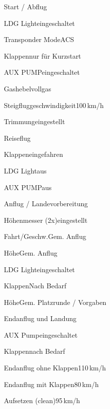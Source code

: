 \begin{checklist}{Start / Abflug}
	  \item{LDG Light}{eingeschaltet}
	  \item{Transponder Mode}{ACS}
	  \item{Klappen}{nur für Kurzstart}
	  \item{AUX PUMP}{eingeschaltet}
	  \item{Gashebel}{vollgas}
	\item{Steigfluggeschwindigkeit}{100\,km/h}
	\item{Trimmung}{eingestellt}
\end{checklist}
	
\begin{checklist}{Reiseflug}
	\item{Klappen}{eingefahren}
	\item{LDG Light}{aus}
	\item{AUX PUMP}{aus}
\end{checklist}

\begin{checklist}{Anflug / Landevorbereitung}
	\item{Höhenmesser (2x)}{eingestellt}
	\item{Fahrt/Geschw.}{Gem. Anflug}
	\item{Höhe}{Gem. Anflug}
	\item{LDG Light}{eingeschaltet}
	\item{Klappen}{Nach Bedarf}
	\item{Höhe}{Gem. Platzrunde / Vorgaben}
\end{checklist}

\begin{checklist}{Endanflug und Landung}
	\item{AUX Pump}{eingeschaltet}
	\item{Klappen}{nach Bedarf}
	\item{Endanflug ohne Klappen}{110\,km/h}
	\item{Endanflug mit Klappen}{80\,km/h}
	\item{Aufsetzen (clean)}{95\,km/h}
\end{checklist}

